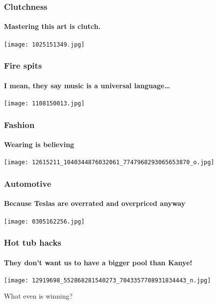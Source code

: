 \documentclass{beamer}
\begin{document}
\begin{frame}
\frametitle{Clutchness}
\framesubtitle{Mastering this art is clutch.}
\begin{center}
\texttt{[image: 1025151349.jpg]}
\end{center}
\end{frame}

\begin{frame}
\frametitle{Fire spits}
\framesubtitle{I mean, they say music is a universal language\ldots}
\begin{center}
\texttt{[image: 1108150013.jpg]}
\end{center}
\end{frame}

\begin{frame}
\frametitle{Fashion}
\framesubtitle{Wearing is believing}
\begin{center}
\texttt{[image: 12615211\_1040344876032061\_7747968293065653870\_o.jpg]}
\end{center}
\end{frame}

\begin{frame}
\frametitle{Automotive}
\framesubtitle{Because Teslas are overrated and overpriced anyway}
\begin{center}
\texttt{[image: 0305162256.jpg]}
\end{center}
\end{frame}

\begin{frame}
\frametitle{Hot tub hacks}
\framesubtitle{They don't want us to have a bigger pool than Kanye!}
\begin{center}
\texttt{[image: 12919698\_552868281540273\_7043357708931834443\_n.jpg]}
\end{center}
\end{frame}

\begin{frame}
\begin{center}
{\Huge What even is winning?}
\end{center}
\end{frame}
\end{document}
